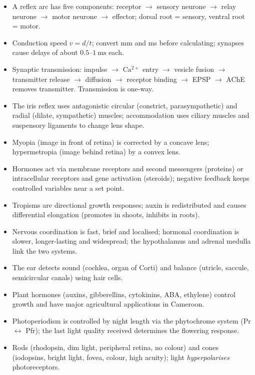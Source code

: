 \documentclass[11pt]{article}
\begin{document}
\begin{aretenir}
\begin{itemize}
\item A reflex arc has five components: receptor $\rightarrow$ sensory neurone $\rightarrow$ relay neurone $\rightarrow$ motor neurone $\rightarrow$ effector; dorsal root = sensory, ventral root = motor.
\item Conduction speed $v = d/t$; convert mm and ms before calculating; synapses cause delays of about $0.5$--$1\ \mathrm{ms}$ each.
\item Synaptic transmission: impulse $\rightarrow$ $\mathrm{Ca^{2+}}$ entry $\rightarrow$ vesicle fusion $\rightarrow$ transmitter release $\rightarrow$ diffusion $\rightarrow$ receptor binding $\rightarrow$ EPSP $\rightarrow$ AChE removes transmitter. Transmission is one-way.
\item The iris reflex uses antagonistic circular (constrict, parasympathetic) and radial (dilate, sympathetic) muscles; accommodation uses ciliary muscles and suspensory ligaments to change lens shape.
\item Myopia (image in front of retina) is corrected by a concave lens; hypermetropia (image behind retina) by a convex lens.
\item Hormones act via membrane receptors and second messengers (proteins) or intracellular receptors and gene activation (steroids); negative feedback keeps controlled variables near a set point.
\item Tropisms are directional growth responses; auxin is redistributed and causes differential elongation (promotes in shoots, inhibits in roots).
\item Nervous coordination is fast, brief and localised; hormonal coordination is slower, longer-lasting and widespread; the hypothalamus and adrenal medulla link the two systems.
\item The ear detects sound (cochlea, organ of Corti) and balance (utricle, saccule, semicircular canals) using hair cells.
\item Plant hormones (auxins, gibberellins, cytokinins, ABA, ethylene) control growth and have major agricultural applications in Cameroon.
\item Photoperiodism is controlled by night length via the phytochrome system (Pr $\leftrightarrow$ Pfr); the last light quality received determines the flowering response.
\item Rods (rhodopsin, dim light, peripheral retina, no colour) and cones (iodopsins, bright light, fovea, colour, high acuity); light \emph{hyperpolarises} photoreceptors.
\end{itemize}
\end{aretenir}
\end{document}
